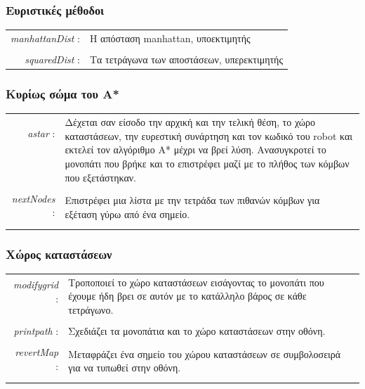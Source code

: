 \documentclass[a4paper,9pt]{article}
\begin{document}
\subsubsection{Eυριστικές μέθοδοι}
\begin{tabular}{r l}
    \emph{manhattanDist} :&Η απόσταση manhattan, υποεκτιμητής\\
    &\\
    \emph{squaredDist} :&Τα τετράγωνα των αποστάσεων, υπερεκτιμητής\\
\end{tabular}
\subsubsection{Κυρίως σώμα του Α*}
\begin{tabular}{r l}
    \emph{astar} :&\multirow{5}{10cm}{Δέχεται σαν είσοδο την αρχική και την τελική θέση, το χώρο
        καταστάσεων, την ευρεστική συνάρτηση και τον κωδικό του robot και εκτελεί
        τον αλγόριθμο Α* μέχρι να βρεί λύση. Ανασυγκροτεί το μονοπάτι που βρήκε
        και το επιστρέφει μαζί με το πλήθος των κόμβων που εξετάστηκαν.}\\
    &\\&\\&\\&\\&\\
    \emph{nextNodes} :&\multirow{2}{10cm}{Επιστρέφει μια λίστα με την τετράδα των πιθανών
        κόμβων για εξέταση γύρω από ένα σημείο.}\\
        &\\&\\
\end{tabular}
\subsubsection{Χώρος καταστάσεων}
\begin{tabular}{r l}
    \emph{modifygrid} :&\multirow{3}{10cm}{Τροποποιεί το χώρο καταστάσεων
        εισάγοντας το μονοπάτι που έχουμε ήδη βρει σε αυτόν με το κατάλληλο βάρος σε
        κάθε τετράγωνο.}\\
        &\\&\\&\\
    \emph{printpath} :&Σχεδιάζει τα μονοπάτια και το χώρο καταστάσεων στην
        οθόνη.\\
        &\\
    \emph{revertMap} :&\multirow{2}{10cm}{Μεταφράζει ένα σημείο του χώρου καταστάσεων σε
        συμβολοσειρά για να τυπωθεί στην οθόνη.}\\
        &\\&\\
\end{tabular}
\end{document}

